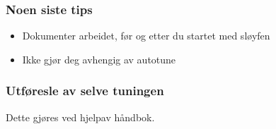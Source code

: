 \documentclass[aspectratio=169,xcolor=dvipsnames]{beamer}
\begin{document}
%
%
%
%
%
%
%
%
%
%
%
%
%
%
%
\begin{frame}
	\frametitle{Noen siste tips}
	\begin{itemize}
		\item Dokumenter arbeidet, før og etter du startet med sløyfen
		\item Ikke gjør deg avhengig av autotune
	\end{itemize}

	
\end{frame}
\begin{frame}
	\frametitle{Utføresle av selve tuningen}
Dette gjøres ved hjelpav håndbok. 
\end{frame}
\end{document}
